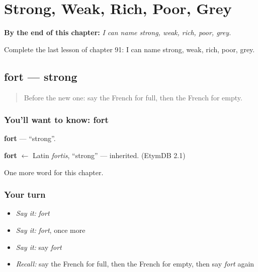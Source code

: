 
\chapter{Strong, Weak, Rich, Poor, Grey}
\label{ch:fr-strong-weak-rich-poor-grey}

\begin{chapteropening}
\textbf{By the end of this chapter:} \emph{I can name strong, weak, rich, poor, grey.}

Complete the last lesson of chapter 91: I can name strong, weak, rich, poor, grey.
\end{chapteropening}

\section[fort]{fort — strong}

\label{lesson:FR-C91-fort}



\begin{quote}
Before the new one: say the French for full, then the French for empty.
\end{quote}

\subsection*{You'll want to know: fort}
\textbf{fort} — \textquotedblleft{}strong\textquotedblright{}.

\begin{cousinweb}
\textbf{fort} $\leftarrow$ Latin \emph{fortis}, \textquotedblleft{}strong\textquotedblright{} — inherited. (EtymDB 2.1)
\end{cousinweb}

\begin{grammarlens}[title={What you've built}]
One more word for this chapter.
\end{grammarlens}

\subsection*{Your turn}
\begin{itemize}
\raggedright
  \item \emph{Say it:} \emph{fort}
  \item \emph{Say it:} \emph{fort}, once more
  \item \emph{Say it:} say \emph{fort}
  \item \emph{Recall:} say the French for full, then the French for empty, then say \emph{fort} again
\end{itemize}

